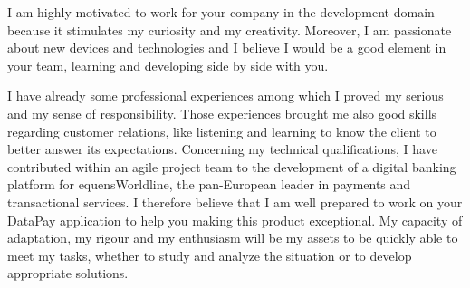 \documentclass[11pt, a4paper]{awesome-cv}
\begin{document}
\begin{cvletter}
I am highly motivated to work for your company in the development domain because it stimulates my curiosity and my creativity. %
Moreover, I am passionate about new devices and technologies and I believe I would be a good element in your team, learning and developing side by side with you. 

\vspace{2mm} 

I have already some professional experiences among which I proved my serious and my sense of responsibility. Those experiences brought me also good skills regarding customer relations, like listening and learning to know the client to better answer its expectations. Concerning my technical qualifications, I have contributed within an agile project team to the development of a digital banking platform for equensWorldline, the pan-European leader in payments and transactional services. I therefore believe that I am well prepared to work on your DataPay application to help you making this product exceptional. \newline
My capacity of adaptation, my rigour and my enthusiasm will be my assets to be quickly able to meet my tasks, whether to study and analyze the situation or to develop appropriate solutions. 




\end{cvletter}


\makeletterclosing
\end{document}

